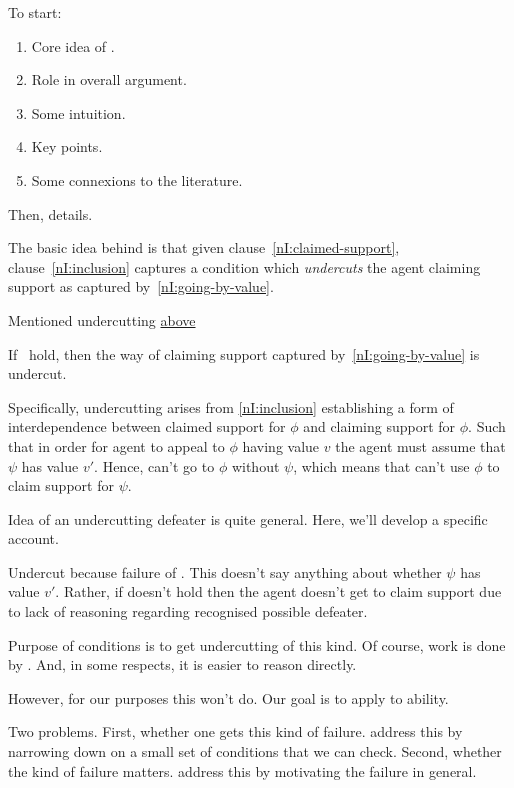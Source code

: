 \begin{note}[Plan]
  To start:
  \begin{enumerate}
  \item Core idea of \nI{}.
  \item Role in overall argument.
  \item Some intuition.
  \item Key points.
  \item Some connexions to the literature.
  \end{enumerate}
  Then, details.
\end{note}

\begin{note}
  The basic idea behind \nI{} is that given clause~\ref{nI:claimed-support}, clause~\ref{nI:inclusion} captures a condition which \emph{undercuts} the agent claiming support as captured by~\ref{nI:going-by-value}.

  Mentioned undercutting {\color{red} \hyperref[first-mention-undercutting-defeater]{above}}

  If~\nIBackground{} hold, then the way of claiming support captured by~\ref{nI:going-by-value} is undercut.

  {
    \color{red}
    Specifically, undercutting arises from \ref{nI:inclusion} establishing a form of interdependence between claimed support for \(\phi\) and claiming support for \(\phi\).
  }
  Such that in order for agent to appeal to \(\phi\) having value \(v\) the agent must assume that \(\psi\) has value \(v'\).
  Hence, can't go to \(\phi\) without \(\psi\), which means that can't use \(\phi\) to claim support for \(\psi\).
\end{note}

\begin{note}[\eiS{}]
  Idea of an undercutting defeater is quite general.
  Here, we'll develop a specific account.

  Undercut because failure of \eiS{}.
  This doesn't say anything about whether \(\psi\) has value \(v'\).
  Rather, if \eiS{} doesn't hold then the agent doesn't get to claim support {\color{red} due to lack of reasoning regarding recognised possible defeater}.
\end{note}

\begin{note}
  Purpose of conditions is to get undercutting of this kind.
  Of course, work is done by \eiS{}.
  And, in some respects, it is easier to reason directly.

  However, for our purposes this won't do.
  Our goal is to apply \nI{} to ability.

  Two problems.
  First, whether one gets this kind of failure.
  \nI{} address this by narrowing down on a small set of conditions that we can check.
  Second, whether the kind of failure matters.
  \nI{} address this by motivating the failure in general.
\end{note}

